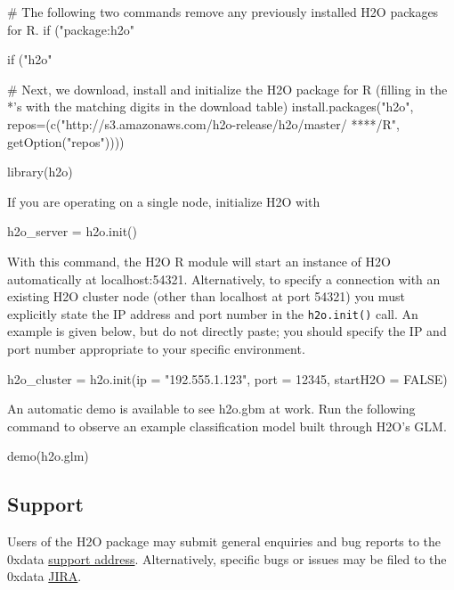 \documentclass[11pt]{article}
\begin{document}
\begin{spverbatim}
# The following two commands remove any previously installed H2O packages for R.
if ("package:h2o" %

if ("h2o" %

# Next, we download, install and initialize the H2O package for R (filling in the *'s with the matching digits in the download table)
install.packages("h2o", repos=(c("http://s3.amazonaws.com/h2o-release/h2o/master/
****/R", getOption("repos"))))

library(h2o)

\end{spverbatim}
\noindent
If you are operating on a single node, initialize H2O with

\begin{spverbatim}
h2o_server = h2o.init()

\end{spverbatim}
\noindent
With this command, the H2O R module will start an instance of H2O automatically at localhost:54321. Alternatively,  to specify a connection with an existing H2O cluster node (other than localhost at port 54321) you must explicitly state the IP address and port number in the \texttt{h2o.init()} call. An example is given below, but do not directly paste; you should specify the IP and port number appropriate to your specific environment.

\begin{spverbatim}
h2o_cluster = h2o.init(ip = "192.555.1.123", port = 12345, startH2O = FALSE)

\end{spverbatim}
\noindent
An automatic demo is available to see h2o.gbm at work. Run the following command to observe an example classification model built through H2O's GLM.

\begin{spverbatim}
demo(h2o.glm)
\end{spverbatim}

\subsection{Support} 

Users of the H2O package may submit general enquiries and bug reports to the 0xdata \href{h2ostream@googlegroups.com}{support address}. Alternatively, specific bugs or issues may be filed to the 0xdata \href{https://0xdata.atlassian.net/secure/Dashboard.jspa}{JIRA}.
\end{document}
